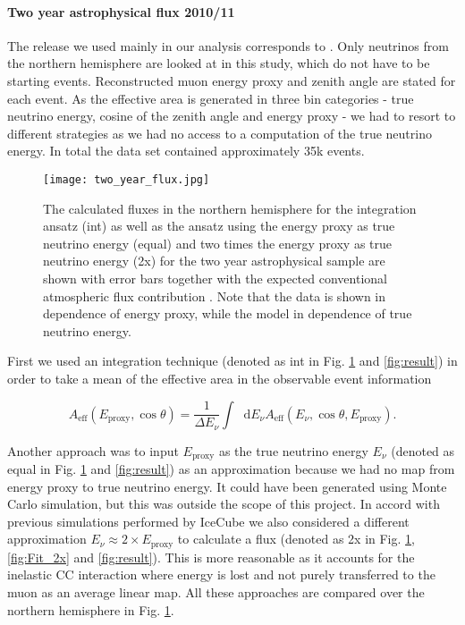 \documentclass[%
 reprint,
 preprintnumbers,
 nofootinbib,
 amsmath,amssymb,
 aps,
]{revtex4-2}
\newcommand*\diff{\mathop{}\!\mathrm{d}}
\begin{document}
\paragraph{Two year astrophysical flux 2010/11} The release we used mainly in our analysis corresponds to \cite{2yearAstro}. Only neutrinos from the northern hemisphere are looked at in this study, which do not have to be starting events. Reconstructed muon energy proxy and zenith angle are stated for each event. As the effective area is generated in three bin categories - true neutrino energy, cosine of the zenith angle and energy proxy - we had to resort to different strategies as we had no access to a computation of the true neutrino energy. In total the data set contained approximately 35k events.

\begin{figure}[h]
	\centering
	\texttt{[image: two\_year\_flux.jpg]}
	\caption{\label{fig:two-year} The calculated fluxes in the northern hemisphere for the integration ansatz (int) as well as the ansatz using the energy proxy as true neutrino energy (equal) and two times the energy proxy as true neutrino energy (2x) for the two year astrophysical sample are shown with error bars together with the expected conventional atmospheric flux contribution \cite{Honda_2007,2yearAstro}. Note that the data is shown in dependence of energy proxy, while the model in dependence of true neutrino energy.}
\end{figure}

First we used an integration technique (denoted as int in Fig. \ref{fig:two-year} and \ref{fig:result}) in order to take a mean of the effective area in the observable event information

\begin{equation}
    A_{\text{eff}}(E_{\text{proxy}},\cos\theta) = \frac{1}{\Delta E_{\nu}} \int \diff E_{\nu} A_{\text{eff}}(E_{\nu},\cos\theta,E_{\text{proxy}}).
\end{equation}



Another approach was to input $E_{\text{proxy}}$ as the true neutrino energy $E_\nu$ (denoted as equal in Fig. \ref{fig:two-year} and \ref{fig:result}) as an approximation because we had no map from energy proxy to true neutrino energy. It could have been generated using Monte Carlo simulation, but this was outside the scope of this project. In accord with previous simulations performed by IceCube we also considered a different approximation $E_\nu \approx 2\times E_{\text{proxy}}$ to calculate a flux (denoted as 2x in Fig. \ref{fig:two-year}, \ref{fig:Fit_2x} and \ref{fig:result}). This is more reasonable as it accounts for the inelastic CC interaction where energy is lost and not purely transferred to the muon as an average linear map. All these approaches are compared over the northern hemisphere in Fig. \ref{fig:two-year}.
\end{document}
